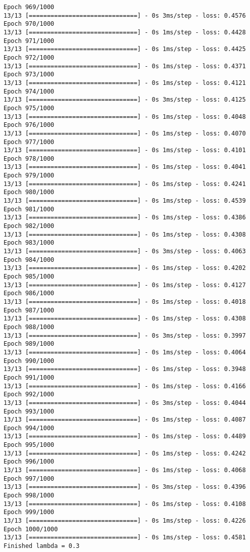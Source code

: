 \documentclass[11pt]{article}
\begin{document}
\begin{Verbatim}[commandchars=\\\{\}]
Epoch 969/1000
13/13 [==============================] - 0s 3ms/step - loss: 0.4576
Epoch 970/1000
13/13 [==============================] - 0s 1ms/step - loss: 0.4428
Epoch 971/1000
13/13 [==============================] - 0s 1ms/step - loss: 0.4425
Epoch 972/1000
13/13 [==============================] - 0s 1ms/step - loss: 0.4371
Epoch 973/1000
13/13 [==============================] - 0s 1ms/step - loss: 0.4121
Epoch 974/1000
13/13 [==============================] - 0s 3ms/step - loss: 0.4125
Epoch 975/1000
13/13 [==============================] - 0s 1ms/step - loss: 0.4048
Epoch 976/1000
13/13 [==============================] - 0s 1ms/step - loss: 0.4070
Epoch 977/1000
13/13 [==============================] - 0s 1ms/step - loss: 0.4101
Epoch 978/1000
13/13 [==============================] - 0s 1ms/step - loss: 0.4041
Epoch 979/1000
13/13 [==============================] - 0s 1ms/step - loss: 0.4241
Epoch 980/1000
13/13 [==============================] - 0s 1ms/step - loss: 0.4539
Epoch 981/1000
13/13 [==============================] - 0s 1ms/step - loss: 0.4386
Epoch 982/1000
13/13 [==============================] - 0s 1ms/step - loss: 0.4308
Epoch 983/1000
13/13 [==============================] - 0s 3ms/step - loss: 0.4063
Epoch 984/1000
13/13 [==============================] - 0s 1ms/step - loss: 0.4202
Epoch 985/1000
13/13 [==============================] - 0s 1ms/step - loss: 0.4127
Epoch 986/1000
13/13 [==============================] - 0s 1ms/step - loss: 0.4018
Epoch 987/1000
13/13 [==============================] - 0s 1ms/step - loss: 0.4308
Epoch 988/1000
13/13 [==============================] - 0s 3ms/step - loss: 0.3997
Epoch 989/1000
13/13 [==============================] - 0s 1ms/step - loss: 0.4064
Epoch 990/1000
13/13 [==============================] - 0s 1ms/step - loss: 0.3948
Epoch 991/1000
13/13 [==============================] - 0s 1ms/step - loss: 0.4166
Epoch 992/1000
13/13 [==============================] - 0s 3ms/step - loss: 0.4044
Epoch 993/1000
13/13 [==============================] - 0s 1ms/step - loss: 0.4087
Epoch 994/1000
13/13 [==============================] - 0s 1ms/step - loss: 0.4489
Epoch 995/1000
13/13 [==============================] - 0s 1ms/step - loss: 0.4242
Epoch 996/1000
13/13 [==============================] - 0s 1ms/step - loss: 0.4068
Epoch 997/1000
13/13 [==============================] - 0s 3ms/step - loss: 0.4396
Epoch 998/1000
13/13 [==============================] - 0s 1ms/step - loss: 0.4108
Epoch 999/1000
13/13 [==============================] - 0s 1ms/step - loss: 0.4226
Epoch 1000/1000
13/13 [==============================] - 0s 1ms/step - loss: 0.4581
Finished lambda = 0.3
    \end{Verbatim}
\end{document}
